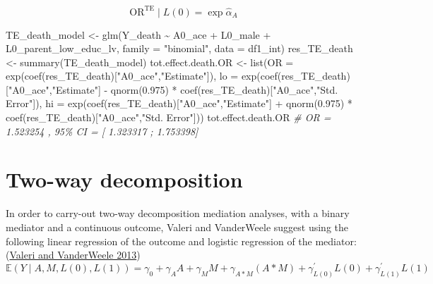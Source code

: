 \documentclass[
]{book}
\newenvironment{Shaded}{\begin{snugshade}}{\end{snugshade}}
\newcommand{\AttributeTok}[1]{\textcolor[rgb]{0.77,0.63,0.00}{#1}}
\newcommand{\CommentTok}[1]{\textcolor[rgb]{0.56,0.35,0.01}{\textit{#1}}}
\newcommand{\FloatTok}[1]{\textcolor[rgb]{0.00,0.00,0.81}{#1}}
\newcommand{\FunctionTok}[1]{\textcolor[rgb]{0.00,0.00,0.00}{#1}}
\newcommand{\NormalTok}[1]{#1}
\newcommand{\OtherTok}[1]{\textcolor[rgb]{0.56,0.35,0.01}{#1}}
\newcommand{\SpecialCharTok}[1]{\textcolor[rgb]{0.00,0.00,0.00}{#1}}
\newcommand{\StringTok}[1]{\textcolor[rgb]{0.31,0.60,0.02}{#1}}
\begin{document}
\[ \text{OR}^{\text{TE}} \mid L(0) = \exp \hat{\alpha}_A \]

\begin{Shaded}
\begin{Highlighting}[]
\NormalTok{TE\_death\_model }\OtherTok{\textless{}{-}} \FunctionTok{glm}\NormalTok{(Y\_death }\SpecialCharTok{\textasciitilde{}}\NormalTok{ A0\_ace }\SpecialCharTok{+}\NormalTok{ L0\_male }\SpecialCharTok{+}\NormalTok{ L0\_parent\_low\_educ\_lv,}
                      \AttributeTok{family =} \StringTok{"binomial"}\NormalTok{,}
                      \AttributeTok{data =}\NormalTok{ df1\_int)}
\NormalTok{res\_TE\_death }\OtherTok{\textless{}{-}} \FunctionTok{summary}\NormalTok{(TE\_death\_model)}
\NormalTok{tot.effect.death.OR }\OtherTok{\textless{}{-}} \FunctionTok{list}\NormalTok{(}\AttributeTok{OR =} \FunctionTok{exp}\NormalTok{(}\FunctionTok{coef}\NormalTok{(res\_TE\_death)[}\StringTok{"A0\_ace"}\NormalTok{,}\StringTok{"Estimate"}\NormalTok{]),}
                            \AttributeTok{lo =} \FunctionTok{exp}\NormalTok{(}\FunctionTok{coef}\NormalTok{(res\_TE\_death)[}\StringTok{"A0\_ace"}\NormalTok{,}\StringTok{"Estimate"}\NormalTok{] }\SpecialCharTok{{-}}
                                       \FunctionTok{qnorm}\NormalTok{(}\FloatTok{0.975}\NormalTok{) }\SpecialCharTok{*}
                                       \FunctionTok{coef}\NormalTok{(res\_TE\_death)[}\StringTok{"A0\_ace"}\NormalTok{,}\StringTok{"Std. Error"}\NormalTok{]),}
                            \AttributeTok{hi =} \FunctionTok{exp}\NormalTok{(}\FunctionTok{coef}\NormalTok{(res\_TE\_death)[}\StringTok{"A0\_ace"}\NormalTok{,}\StringTok{"Estimate"}\NormalTok{] }\SpecialCharTok{+}
                                       \FunctionTok{qnorm}\NormalTok{(}\FloatTok{0.975}\NormalTok{) }\SpecialCharTok{*}
                                       \FunctionTok{coef}\NormalTok{(res\_TE\_death)[}\StringTok{"A0\_ace"}\NormalTok{,}\StringTok{"Std. Error"}\NormalTok{]))}
\NormalTok{tot.effect.death.OR}
\CommentTok{\# OR = 1.523254 , 95\% CI = [ 1.323317 ; 1.753398]}
\end{Highlighting}
\end{Shaded}

\hypertarget{trad2way}{%
\section{Two-way decomposition}\label{trad2way}}

In order to carry-out two-way decomposition mediation analyses, with a binary mediator and a continuous outcome, Valeri and VanderWeele suggest using the following linear regression of the outcome and logistic regression of the mediator:(\protect\hyperlink{ref-valeri2013}{Valeri and VanderWeele 2013})
\begin{equation}
\mathbb{E}(Y \mid A, M,L(0),L(1)) = \gamma_0 + \gamma_A A + \gamma_M M + \gamma_{A \ast M} (A \ast M) + \gamma_{L(0)}^\prime L(0) + \gamma_{L(1)}^\prime L(1) 
\label{eq:contoutcomereg}
\end{equation}
\end{document}
